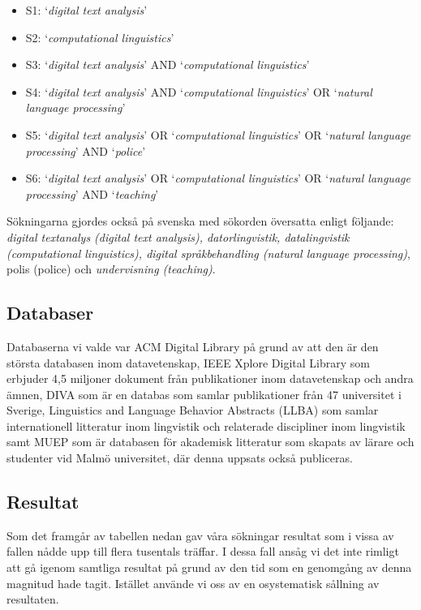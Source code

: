 \documentclass[swedish]{maucsthesis}
\begin{document}
\begin{itemize}
\item S1: ‘\textit{digital text analysis}’
\item S2: ‘\textit{computational linguistics}’
\item S3: ‘\textit{digital text analysis}’ AND ‘\textit{computational
    linguistics}’
\item S4: ‘\textit{digital text analysis}’ AND ‘\textit{computational
    linguistics}’ OR ‘\textit{natural language processing}’
\item S5: ‘\textit{digital text analysis}’ OR
  ‘\textit{computational linguistics}’ OR ‘\textit{natural language processing}’ AND ‘\textit{police}’ 
\item S6: ‘\textit{digital text analysis}’ OR
  ‘\textit{computational linguistics}’ OR ‘\textit{natural language processing}’ AND ‘\textit{teaching}’ 
\end{itemize}

Sökningarna gjordes också på svenska med sökorden översatta enligt följande: \textit
{digital textanalys (digital text analysis), datorlingvistik, datalingvistik
(computational linguistics), digital språkbehandling (natural language processing)}, {polis (police)} och
\textit {undervisning (teaching)}.

\subsection{Databaser}
Databaserna vi valde var ACM Digital Library på grund av att den är den
största databasen inom datavetenskap, IEEE Xplore Digital Library som erbjuder
4,5 miljoner dokument från publikationer inom datavetenskap och andra ämnen,
DIVA som är en databas som samlar publikationer från 47 universitet i Sverige,
Linguistics and Language Behavior Abstracts (LLBA) som samlar internationell
litteratur inom lingvistik och relaterade discipliner inom lingvistik samt
MUEP som är databasen för akademisk litteratur som skapats av lärare och
studenter vid Malmö universitet, där denna uppsats också publiceras. 

\subsection{Resultat}
Som det framgår av tabellen nedan gav våra sökningar resultat som i vissa av fallen nådde upp till flera tusentals träffar. I dessa fall ansåg vi det inte rimligt att gå igenom samtliga resultat på grund av den tid som en genomgång av denna magnitud hade tagit. Istället använde vi oss av en osystematisk sållning av resultaten.
\end{document}
